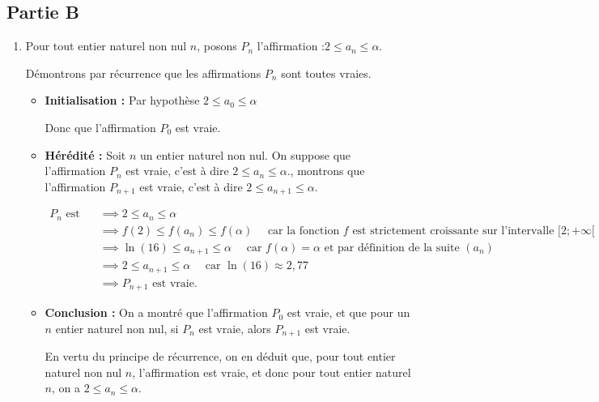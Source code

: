 \subsection*{Partie B}


\begin{enumerate}
	\item 	Pour tout entier naturel non  nul $n$, posons $P_n$ l'affirmation :\quad \og $2 \leqslant a_{n} \leqslant \alpha$\fg{}.

	Démontrons par récurrence que les affirmations $P_n$ sont toutes vraies.

	\begin{itemize}[label={\textbullet~}]
		\item \textbf{Initialisation :}  Par hypothèse  $2 \leqslant a_{0} \leqslant \alpha$

		Donc que l'affirmation $P_0$ est vraie.

		\item \textbf{Hérédité :} Soit $n$ un entier naturel non nul. On suppose que l'affirmation $P_n$ est vraie, c'est à dire $2 \leqslant a_{n} \leqslant \alpha$\fg{}., montrons que l'affirmation $P_{n+1}$ est vraie, c'est à dire $2 \leqslant a_{n+1} \leqslant \alpha$\fg{}.

		$\begin{aligned}
			P_n \text{ est vraie}
			&\implies 2 \leqslant a_{n} \leqslant \alpha\\
			&\implies f(2) \leqslant f\left(a_n\right)\leqslant f(\alpha)\quad \text{ car la fonction }f \text{ est strictement croissante sur l'intervalle }[2;+\infty[\\
			&\implies   \ln(16) \leqslant a_{n+1} \leqslant \alpha  \quad \text{ car } f(\alpha)=\alpha \text{ et par définition de la suite } \left(a_n\right)  \\
			&\implies 2 \leqslant a_{n+1} \leqslant \alpha \quad \text{ car } \ln(16)\approx 2,77\\
			&\implies P_{n+1}\text{ est vraie.}
		\end{aligned}$
		\item \textbf{Conclusion :} On a montré que l'affirmation $P_0$ est vraie, et que pour un $n$ entier naturel non nul, si $P_n$ est vraie, alors $P_{n+1}$ est vraie.

		En vertu du principe de récurrence, on en déduit que, pour tout entier naturel non nul $n$, l'affirmation est vraie, et donc pour tout entier naturel $n$, on a $2 \leqslant a_{n} \leqslant \alpha$.

	\end{itemize}





\end{enumerate}
